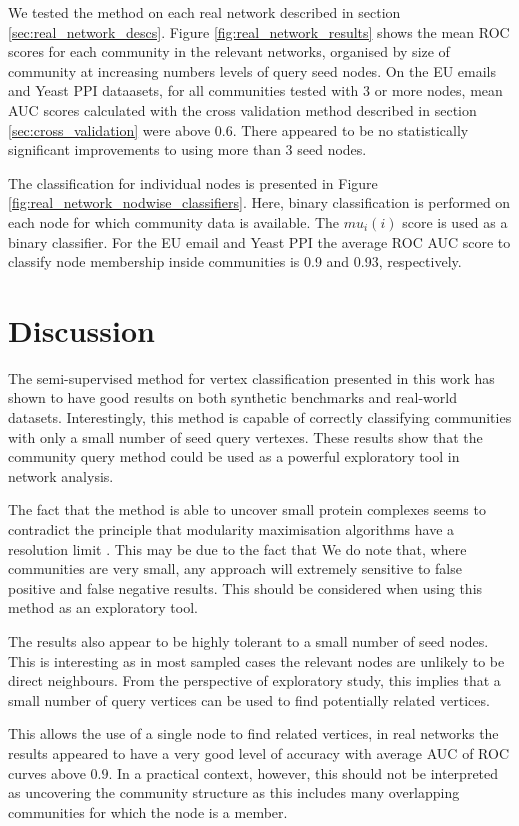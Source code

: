 \documentclass[a4paper,10pt]{article}
\begin{document}
We tested the method on each real network described in section \ref{sec:real_network_descs}.
Figure \ref{fig:real_network_results} shows the mean ROC scores for each community in the relevant networks, organised by size of community at increasing numbers levels of query seed nodes.
On the EU emails and Yeast PPI dataasets, for all communities tested with 3 or more nodes, mean AUC scores calculated with the cross validation method described in section \ref{sec:cross_validation} were above 0.6.
There appeared to be no statistically significant improvements to using more than 3 seed nodes.

The classification for individual nodes is presented in Figure \ref{fig:real_network_nodwise_classifiers}.
Here, binary classification is performed on each node for which community data is available.
The $mu_i({i})$ score is used as a binary classifier.
For the EU email and Yeast PPI the average ROC AUC score to classify node membership inside communities is 0.9 and 0.93, respectively.

\section{Discussion}
The semi-supervised method for vertex classification presented in this work has shown to have good results on both synthetic benchmarks and real-world datasets.
Interestingly, this method is capable of correctly classifying communities with only a small number of seed query vertexes.
These results show that the community query method could be used as a powerful exploratory tool in network analysis.

The fact that the method is able to uncover small protein complexes seems to contradict the principle that modularity maximisation algorithms have a resolution limit \cite{}.
This may be due to the fact that
We do note that, where communities are very small, any approach will extremely sensitive to false positive and false negative results.
This should be considered when using this method as an exploratory tool.

The results also appear to be highly tolerant to a small number of seed nodes.
This is interesting as in most sampled cases the relevant nodes are unlikely to be direct neighbours.
From the perspective of exploratory study, this implies that a small number of query vertices can be used to find potentially related vertices.

This allows the use of a single node to find related vertices, in real networks the results appeared to have a very good level of accuracy with average AUC of ROC curves above $0.9$.
In a practical context, however, this should not be interpreted as uncovering the community structure as this includes many overlapping communities for which the node is a member.
\end{document}
